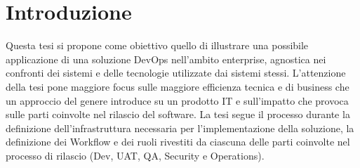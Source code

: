 \documentclass[a4paper, 12pt]{report}
\numberwithin{equation}{section}
\begin{document}
\chapter*{Introduzione}
Questa tesi si propone come obiettivo quello di illustrare una possibile applicazione di una soluzione DevOps nell’ambito enterprise, agnostica nei confronti dei sistemi e delle tecnologie utilizzate dai sistemi stessi.
L’attenzione della tesi pone maggiore focus sulle maggiore efficienza tecnica e di business che un approccio del genere introduce su un prodotto IT e sull’impatto che provoca sulle parti coinvolte nel rilascio del software.
La tesi segue il processo durante la definizione dell’infrastruttura necessaria per l’implementazione della soluzione, la definizione dei Workflow e dei ruoli rivestiti da ciascuna delle parti coinvolte nel processo di rilascio (Dev, UAT, QA, Security e Operations).

\end{document}
